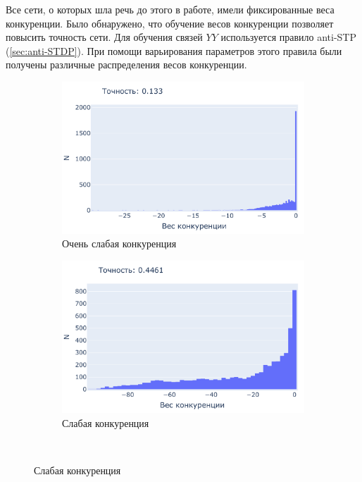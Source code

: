 \documentclass[a4paper]{article}
\begin{document}
Все сети, о которых шла речь до этого в работе, имели фиксированные веса конкуренции. Было обнаружено, что обучение весов конкуренции позволяет повысить точность сети. Для обучения связей $YY$ используется правило anti-STP (\autoref{sec:anti-STDP}). При помощи варьирования параметров этого правила были получены различные распределения весов конкуренции.

\begin{figure}[H]
\centering
\begin{subfigure}{0.45\textwidth}
    \includegraphics[width=\textwidth,keepaspectratio=true]{competition_distribution_worst_ru.pdf}
    \caption{Очень слабая конкуренция}
\end{subfigure}
\begin{subfigure}{0.45\textwidth}
    \includegraphics[width=\textwidth,keepaspectratio=true]{competition_distribution_medium_bad_ru.pdf}
    \caption{Слабая конкуренция}
\end{subfigure}
\\

\end{figure}
\end{document}

